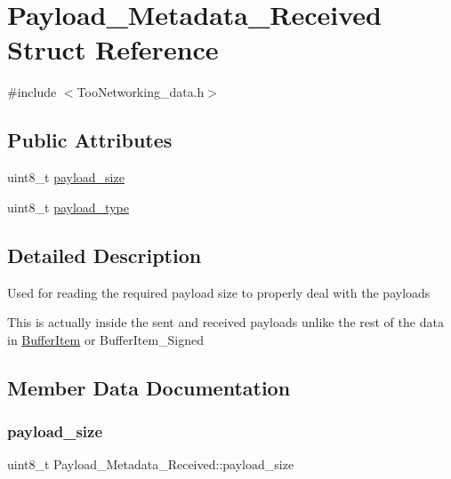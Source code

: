 \hypertarget{structPayload__Metadata__Received}{}\section{Payload\+\_\+\+Metadata\+\_\+\+Received Struct Reference}
\label{structPayload__Metadata__Received}


{\ttfamily \#include $<$Too\+Networking\+\_\+data.\+h$>$}

\subsection*{Public Attributes}
\begin{DoxyCompactItemize}
\item 
uint8\+\_\+t \hyperlink{structPayload__Metadata__Received_a4dcd8b5b8c5a4565f1bac2fc4212bf71}{payload\+\_\+size}
\item 
uint8\+\_\+t \hyperlink{structPayload__Metadata__Received_a0105d708c3cc157a95c3cf4068e290de}{payload\+\_\+type}
\end{DoxyCompactItemize}


\subsection{Detailed Description}
Used for reading the required payload size to properly deal with the payloads

This is actually inside the sent and received payloads unlike the rest of the data in \hyperlink{structBufferItem}{Buffer\+Item} or Buffer\+Item\+\_\+\+Signed 

\subsection{Member Data Documentation}
\mbox{\label{structPayload__Metadata__Received_a4dcd8b5b8c5a4565f1bac2fc4212bf71}} 
\subsubsection{\texorpdfstring{payload\+\_\+size}{payload\_size}}
{\footnotesize\ttfamily uint8\+\_\+t Payload\+\_\+\+Metadata\+\_\+\+Received\+::payload\+\_\+size}

